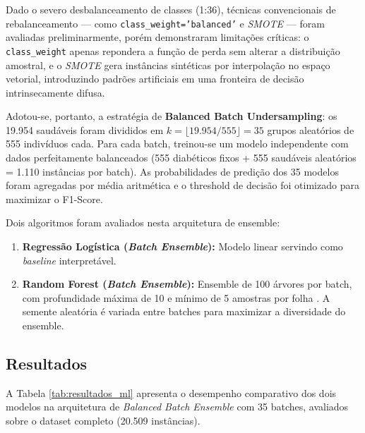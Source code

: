 \documentclass[12pt, a4paper]{article}
\begin{document}
    Dado o severo desbalanceamento de classes (1:36), técnicas convencionais de rebalanceamento — como \texttt{class\_weight='balanced'} e \textit{SMOTE} \cite{chawla2002smote} — foram avaliadas preliminarmente, porém demonstraram limitações críticas: o \texttt{class\_weight} apenas repondera a função de perda sem alterar a distribuição amostral, e o \textit{SMOTE} gera instâncias sintéticas por interpolação no espaço vetorial, introduzindo padrões artificiais em uma fronteira de decisão intrinsecamente difusa.

    Adotou-se, portanto, a estratégia de \textbf{Balanced Batch Undersampling}: os 19.954 saudáveis foram divididos em $k = \lfloor 19{.}954 / 555 \rfloor = 35$ grupos aleatórios de 555 indivíduos cada. Para cada batch, treinou-se um modelo independente com dados perfeitamente balanceados (555 diabéticos fixos + 555 saudáveis aleatórios = 1.110 instâncias por batch). As probabilidades de predição dos 35 modelos foram agregadas por média aritmética e o threshold de decisão foi otimizado para maximizar o F1-Score.

    Dois algoritmos foram avaliados nesta arquitetura de ensemble:
    \begin{enumerate}
        \item \textbf{Regressão Logística (\textit{Batch Ensemble}):} Modelo linear servindo como \textit{baseline} interpretável.
        \item \textbf{Random Forest (\textit{Batch Ensemble}):} Ensemble de 100 árvores por batch, com profundidade máxima de 10 e mínimo de 5 amostras por folha \cite{breiman2001random}. A semente aleatória é variada entre batches para maximizar a diversidade do ensemble.
    \end{enumerate}

    \subsection{Resultados}

    A Tabela \ref{tab:resultados_ml} apresenta o desempenho comparativo dos dois modelos na arquitetura de \textit{Balanced Batch Ensemble} com 35 batches, avaliados sobre o dataset completo (20.509 instâncias).

\begin{table}[h]
    \centering
    \caption{Desempenho dos Modelos — Balanced Batch Undersampling (35 Batches, 1:1)}
    \label{tab:resultados_ml}
\end{table}
\end{document}
